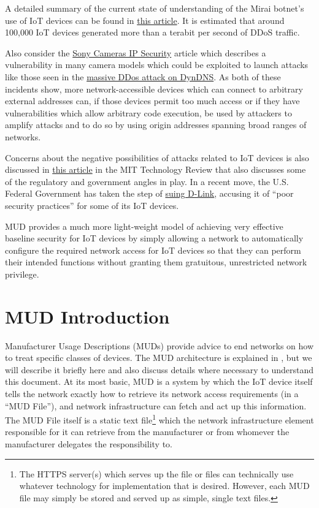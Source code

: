 \documentclass[conference]{IEEEtran}
\begin{document}
A detailed summary of the current state of understanding of the Mirai
botnet's use of IoT devices can be found in
\href{https://www.flashpoint-intel.com/action-analysis-mirai-botnet-attacks-dyn/}{this
article}.  It is estimated that around 100,000 IoT devices generated
more than a terabit per second of DDoS traffic.

Also consider the
\href{http://www.pcworld.com/article/3147311/security/backdoor-accounts-found-in-80-sony-ip-security-camera-models.html}{Sony
Cameras IP Security} article which describes a vulnerability in many
camera models which could be exploited to launch attacks like those
seen in the
\href{http://www.pcworld.com/article/3134056/hacking/an-iot-botnet-is-partly-behind-fridays-massive-ddos-attack.html}{massive
DDos attack on DynDNS}.  As both of these incidents show, more
network-accessible devices which can connect to arbitrary external
addresses can, if those devices permit too much access or if they have
vulnerabilities which allow arbitrary code execution, be used by
attackers to amplify attacks and to do so by using origin addresses
spanning broad ranges of networks.

Concerns about the negative possibilities of attacks related to IoT
devices is also discussed in
\href{https://www.technologyreview.com/s/603015/security-experts-warn-congress-that-the-internet-of-things-could-kill-people/}{this
article} in the MIT Technology Review
that also discusses some of
the regulatory and government angles in play.  In a recent move, the
U.S. Federal Government has taken the step of
\href{https://www.cnet.com/news/d-link-lawsuit-ftc-security-hackers/}{suing
  D-Link}, accusing it of ``poor security practices'' for some of its
IoT devices.

MUD provides a much more light-weight model of achieving very
effective baseline security for IoT devices by simply allowing a
network to automatically configure the required network access for IoT
devices so that they can perform their intended functions without
granting them gratuitous, unrestricted network privilege.

\section{MUD Introduction}
Manufacturer Usage Descriptions (MUDs) provide advice to end networks
on how to treat specific classes of devices.  The MUD architecture is
explained in \cite{I-D:ietf-opsawg-mud}, but we will describe it
briefly here and also discuss details where necessary to understand
this document.  At its most basic, MUD is a system by which the IoT
device itself tells the network exactly how to retrieve its network
access requirements (in a ``MUD File''), and network infrastructure
can fetch and act up this information.  The MUD File itself is a
static text file\footnote{The HTTPS server(s) which serves up the file
  or files can technically use whatever technology for implementation
  that is desired.  However, each MUD file may simply be stored and
  served up as simple, single text files.} which the network
infrastructure element responsible for it can retrieve from the
manufacturer or from whomever the manufacturer delegates the
responsibility to.
\end{document}
